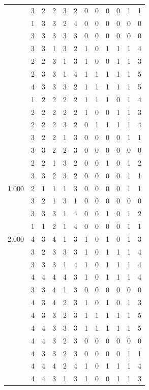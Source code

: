\documentclass[]{book}
\theoremstyle{definition}
\theoremstyle{definition}
\theoremstyle{definition}
\theoremstyle{remark}
\begin{document}
\begin{table}
{\begin{tabular}[t]{rrrrrrrrrrrr}
 & 3 & 2 & 2 & 3 & 2 & 0 & 0 & 0 & 0 & 1 & 1\\
 & 1 & 3 & 3 & 2 & 4 & 0 & 0 & 0 & 0 & 0 & 0\\
 & 3 & 3 & 3 & 3 & 3 & 0 & 0 & 0 & 0 & 0 & 0\\
 & 3 & 3 & 1 & 3 & 2 & 1 & 0 & 1 & 1 & 1 & 4\\
 & 2 & 2 & 3 & 1 & 3 & 1 & 0 & 0 & 1 & 1 & 3\\
 & 2 & 3 & 3 & 1 & 4 & 1 & 1 & 1 & 1 & 1 & 5\\
 & 4 & 3 & 3 & 3 & 2 & 1 & 1 & 1 & 1 & 1 & 5\\
 & 1 & 2 & 2 & 2 & 2 & 1 & 1 & 1 & 0 & 1 & 4\\
 & 2 & 2 & 2 & 2 & 2 & 1 & 0 & 0 & 1 & 1 & 3\\
 & 2 & 2 & 2 & 3 & 2 & 0 & 1 & 1 & 1 & 1 & 4\\
 & 3 & 2 & 2 & 1 & 3 & 0 & 0 & 0 & 0 & 1 & 1\\
 & 3 & 3 & 2 & 2 & 3 & 0 & 0 & 0 & 0 & 0 & 0\\
 & 2 & 2 & 1 & 3 & 2 & 0 & 0 & 1 & 0 & 1 & 2\\
 & 3 & 3 & 2 & 3 & 2 & 0 & 0 & 0 & 0 & 1 & 1\\
1.000 & 2 & 1 & 1 & 1 & 3 & 0 & 0 & 0 & 0 & 1 & 1\\
 & 3 & 2 & 1 & 3 & 1 & 0 & 0 & 0 & 0 & 0 & 0\\
 & 3 & 3 & 3 & 1 & 4 & 0 & 0 & 1 & 0 & 1 & 2\\
 & 1 & 1 & 2 & 1 & 4 & 0 & 0 & 0 & 0 & 1 & 1\\
2.000 & 4 & 3 & 4 & 1 & 3 & 1 & 0 & 1 & 0 & 1 & 3\\
 & 3 & 2 & 3 & 3 & 3 & 1 & 0 & 1 & 1 & 1 & 4\\
 & 3 & 3 & 3 & 1 & 4 & 1 & 0 & 1 & 1 & 1 & 4\\
 & 4 & 4 & 4 & 4 & 3 & 1 & 0 & 1 & 1 & 1 & 4\\
 & 3 & 3 & 4 & 1 & 3 & 0 & 0 & 0 & 0 & 0 & 0\\
 & 4 & 3 & 4 & 2 & 3 & 1 & 0 & 1 & 0 & 1 & 3\\
 & 4 & 3 & 3 & 2 & 3 & 1 & 1 & 1 & 1 & 1 & 5\\
 & 4 & 4 & 3 & 3 & 3 & 1 & 1 & 1 & 1 & 1 & 5\\
 & 4 & 4 & 3 & 2 & 3 & 0 & 0 & 0 & 0 & 0 & 0\\
 & 4 & 3 & 3 & 2 & 3 & 0 & 0 & 0 & 0 & 1 & 1\\
 & 4 & 4 & 4 & 2 & 4 & 1 & 0 & 1 & 1 & 1 & 4\\
 & 4 & 4 & 3 & 1 & 3 & 1 & 0 & 0 & 1 & 1 & 3\\

\end{tabular}}
\end{table}
\end{document}

